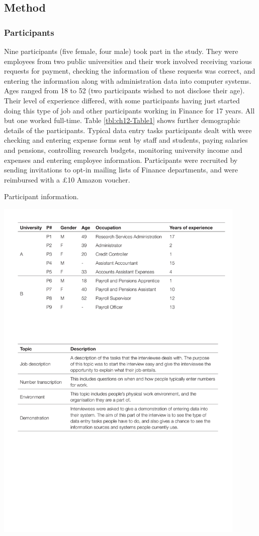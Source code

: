 \subsection{Method}
\subsubsection{Participants}
Nine participants (five female, four male) took part in the study. They were employees from two public universities and their work involved receiving various requests for payment, checking the information of these requests was correct, and entering the information along with administration data into computer systems. Ages ranged from 18 to 52 (two participants wished to not disclose their age). Their level of experience differed, with some participants having just started doing this type of job and other participants working in Finance for 17 years. All but one worked full-time. Table \ref{tbl:ch12-Table1} shows further demographic details of the participants. Typical data entry tasks participants dealt with were checking and entering expense forms sent by staff and students, paying salaries and pensions, controlling research budgets, monitoring university income and expenses and entering employee information. Participants were recruited by sending invitations to opt-in mailing lists of Finance departments, and were reimbursed with a \pounds10 Amazon voucher.

\begin{table}
\caption[Study 1 participant information]{Participant information.}
\centering
\includegraphics[width=0.9\textwidth]{images/ch12/ch12_participants.pdf}
\vspace{-3pt}
\label{tbl:ch12-Table1}
\end{table}

